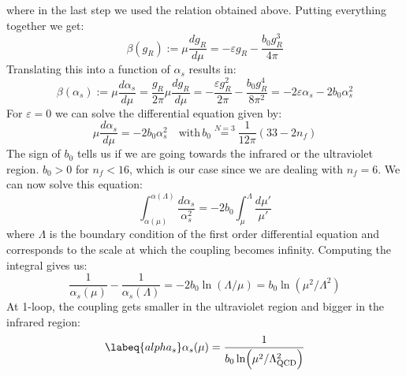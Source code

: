 \documentclass[../main.tex]{subfiles}
\begin{document}
where in the last step we used the relation obtained above. Putting everything together we get:
\[
\beta(g_R):=\mu\frac{dg_R}{d\mu}=-\varepsilon g_R-\frac{b_0g_R^3}{4\pi}
\]
Translating this into a function of $\alpha_s$ results in:
\[
\beta(\alpha_s):=\mu\frac{d\alpha_s}{d\mu}=\frac{g_R}{2\pi}\mu\frac{dg_R}{d\mu}=-\frac{\varepsilon g_R^2}{2\pi}-\frac{b_0g_R^4}{8\pi^2}=-2\varepsilon\alpha_s-2b_0\alpha_s^2
\]
For $\varepsilon=0$ we can solve the differential equation given by:
\[
\mu\frac{d\alpha_s}{d\mu}=-2b_0\alpha_s^2 \quad \text{with}\,b_0\stackrel{N=3}{=}\frac{1}{12\pi}(33-2n_f)
\]
The sign of $b_0$ tells us if we are going towards the infrared or the ultraviolet region. $b_0>0$ for $n_f<16$, which is our case since we are dealing with $n_f=6$. We can now solve this equation:
\[
\int_{\alpha(\mu)}^{\alpha(\Lambda)}\frac{d\alpha_s}{\alpha_s^2}=-2b_0\int_\mu^\Lambda\frac{d\mu'}{\mu'}
\]
where $\Lambda$ is the boundary condition of the first order differential equation and corresponds to the scale at which the coupling becomes infinity. Computing the integral gives us:
\[
\frac{1}{\alpha_s(\mu)}-\frac{1}{\alpha_s(\Lambda)}=-2b_0\ln{(\Lambda/\mu)}=b_0\ln{(\mu^2/\Lambda^2)}
\]
At 1-loop, the coupling gets smaller in the ultraviolet region and bigger in the infrared region:
\begin{equation}
\labeq{alpha_s}
\alpha_s(\mu)=\frac{1}{b_0\ln(\mu^2/\Lambda_{\text{QCD}}^2)}
\end{equation}
\end{document}

